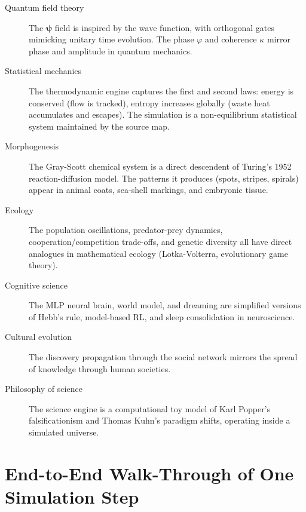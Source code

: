 \documentclass[12pt,a4paper]{article}
\newcommand{\bpsi}{\boldsymbol{\psi}}
\begin{document}
\begin{description}
  \item[Quantum field theory] The $\bpsi$ field is inspired
    by the wave function, with orthogonal gates mimicking
    unitary time evolution.
    The phase $\varphi$ and coherence $\kappa$ mirror
    phase and amplitude in quantum mechanics.

  \item[Statistical mechanics] The thermodynamic engine
    captures the first and second laws: energy is conserved
    (flow is tracked), entropy increases globally
    (waste heat accumulates and escapes).
    The simulation is a non-equilibrium statistical system
    maintained by the source map.

  \item[Morphogenesis] The Gray-Scott chemical system is a
    direct descendent of Turing's 1952 reaction-diffusion model.
    The patterns it produces (spots, stripes, spirals)
    appear in animal coats, sea-shell markings, and
    embryonic tissue.

  \item[Ecology] The population oscillations, predator-prey
    dynamics, cooperation/competition trade-offs, and
    genetic diversity all have direct analogues in
    mathematical ecology (Lotka-Volterra, evolutionary game theory).

  \item[Cognitive science] The MLP neural brain, world model,
    and dreaming are simplified versions of Hebb's rule,
    model-based RL, and sleep consolidation in neuroscience.

  \item[Cultural evolution] The discovery propagation
    through the social network mirrors the spread of knowledge
    through human societies.

  \item[Philosophy of science] The science engine is a
    computational toy model of Karl Popper's falsificationism
    and Thomas Kuhn's paradigm shifts, operating inside a
    simulated universe.
\end{description}

\section{End-to-End Walk-Through of One Simulation Step}
\end{document}
